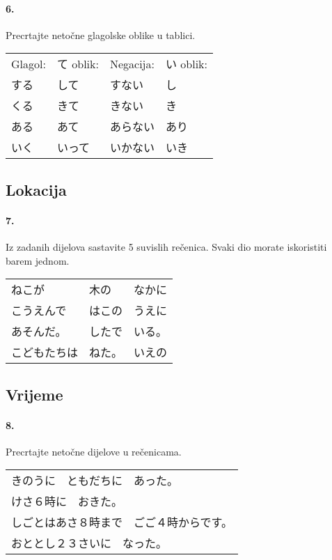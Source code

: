 \documentclass[12pt]{article}
\begin{document}
	\paragraph{6.} Precrtajte netočne glagolske oblike u tablici.
	
	\begin{tabularx}{\textwidth}{X X X X}
		Glagol:&て oblik:&Negacija:&い oblik:\\
		する&して&すない&し\\
		くる&きて&きない&き\\
		ある&あて&あらない&あり\\
		いく&いって&いかない&いき\\
	\end{tabularx}

	\subsection{Lokacija}
	
	\paragraph{7.} Iz zadanih dijelova sastavite 5 suvislih rečenica. Svaki dio morate iskoristiti barem jednom.
	
	\begin{tabularx}{\textwidth}{X X X}
		ねこが&木の&なかに\\
		こうえんで&はこの&うえに\\
		あそんだ。&したで&いる。\\
		こどもたちは&ねた。&いえの\\
	\end{tabularx}
	
	\subsection{Vrijeme}
	
	\paragraph{8.} Precrtajte netočne dijelove u rečenicama.
	
	\begin{tabularx}{\textwidth}{X}
		きのうに　ともだちに　あった。\\
		けさ６時に　おきた。\\
		しごとはあさ８時まで　ごご４時からです。\\
		おととし２３さいに　なった。\\
	\end{tabularx}
\end{document}
